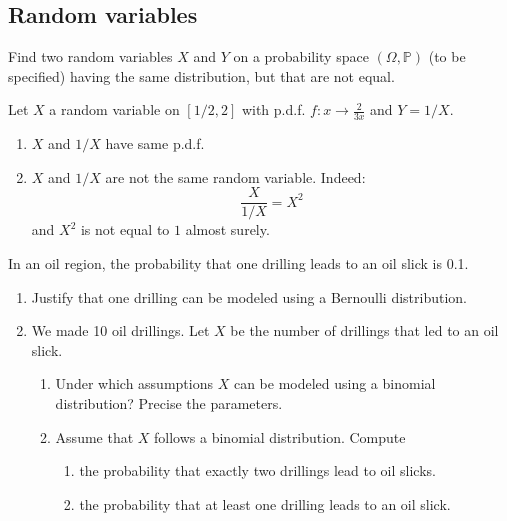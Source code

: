 \begin{center}
  \section*{Random variables}
\end{center}

\begin{Exercise}
  Find two random variables $X$ and $Y$ on a probability space $(\Omega, \mathbb{P})$ (to be specified) having the same distribution, but that are not equal.
\end{Exercise}

\begin{solution}
  Let $X$ a random variable on $[1/2, 2]$ with p.d.f. $f : x \to \frac{2}{3x}$ and $Y = 1/X$.
  \begin{enumerate}
    \item $X$ and $1/X$ have same p.d.f.
    \item $X$ and $1/X$ are not the same random variable. Indeed:
          \[ \frac{X}{1/X} = X^2 \]
          and $X^2$ is not equal to $1$ almost surely.
  \end{enumerate}
\end{solution}

\begin{Exercise}
  In an oil region, the probability that one drilling leads to an oil slick is 0.1.
  \begin{enumerate}
    \item Justify that one drilling can be modeled using a Bernoulli distribution.
    \item We made 10 oil drillings. Let $X$ be the number of drillings that led to an oil slick.
          \begin{enumerate}
            \item Under which assumptions $X$ can be modeled using a binomial distribution? Precise the parameters.
            \item Assume that $X$ follows a binomial distribution. Compute
                  \begin{enumerate}
                    \item the probability that exactly two drillings lead to oil slicks.
                    \item the probability that at least one drilling leads to an oil slick.
                  \end{enumerate}
          \end{enumerate}
  \end{enumerate}
\end{Exercise}


